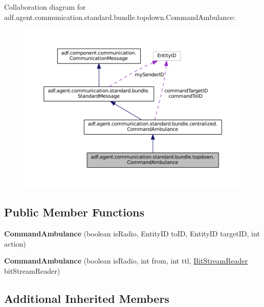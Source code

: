 Collaboration diagram for adf.\+agent.\+communication.\+standard.\+bundle.\+topdown.\+Command\+Ambulance\+:
\nopagebreak
\begin{figure}[H]
\begin{center}
\leavevmode
\includegraphics[width=350pt]{classadf_1_1agent_1_1communication_1_1standard_1_1bundle_1_1topdown_1_1CommandAmbulance__coll__graph}
\end{center}
\end{figure}
\subsection*{Public Member Functions}
\begin{DoxyCompactItemize}
\item 
\hypertarget{classadf_1_1agent_1_1communication_1_1standard_1_1bundle_1_1topdown_1_1CommandAmbulance_ad1a27204ff06b816f7ae46e878a5f06d}{}\label{classadf_1_1agent_1_1communication_1_1standard_1_1bundle_1_1topdown_1_1CommandAmbulance_ad1a27204ff06b816f7ae46e878a5f06d} 
{\bfseries Command\+Ambulance} (boolean is\+Radio, Entity\+ID to\+ID, Entity\+ID target\+ID, int action)
\item 
\hypertarget{classadf_1_1agent_1_1communication_1_1standard_1_1bundle_1_1topdown_1_1CommandAmbulance_a2f2920c0847d04bf2436ce93ab97b426}{}\label{classadf_1_1agent_1_1communication_1_1standard_1_1bundle_1_1topdown_1_1CommandAmbulance_a2f2920c0847d04bf2436ce93ab97b426} 
{\bfseries Command\+Ambulance} (boolean is\+Radio, int from, int ttl, \hyperlink{classadf_1_1component_1_1communication_1_1util_1_1BitStreamReader}{Bit\+Stream\+Reader} bit\+Stream\+Reader)
\end{DoxyCompactItemize}
\subsection*{Additional Inherited Members}


